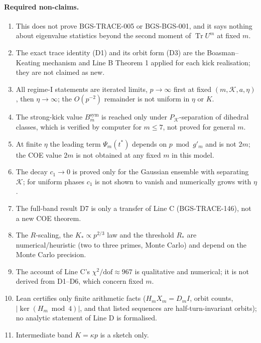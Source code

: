 \paragraph{Required non-claims.}
\begin{enumerate}[label=(\arabic*)]
\item This does not prove BGS-TRACE-005 or BGS-BGS-001, and it says nothing about eigenvalue statistics beyond the second moment of \(\operatorname{Tr}U^m\) at fixed \(m\).
\item The exact trace identity (D1) and its orbit form (D3) are the Boasman--Keating mechanism and Line B Theorem 1 applied for each kick realisation; they are not claimed as new.
\item All regime-I statements are iterated limits, \(p\to\infty\) first at fixed \((m,\mathcal K,a,\eta)\), then \(\eta\to\infty\); the \(O(p^{-2})\) remainder is not uniform in \(\eta\) or \(K\).
\item The strong-kick value \(B_m^{\mathrm{sym}}\) is reached only under \(P_{\mathcal K}\)-separation of dihedral classes, which is verified by computer for \(m\le 7\), not proved for general \(m\).
\item At finite \(\eta\) the leading term \(\Psi_m(t^*)\) depends on \(p \bmod g'_m\) and is not \(2m\); the COE value \(2m\) is not obtained at any fixed \(m\) in this model.
\item The decay \(c_1\to0\) is proved only for the Gaussian ensemble with separating \(\mathcal K\); for uniform phases \(c_1\) is not shown to vanish and numerically grows with \(\eta\).
\item The full-band result D7 is only a transfer of Line C (BGS-TRACE-146), not a new COE theorem.
\item The \(R\)-scaling, the \(K_*\propto p^{2/3}\) law and the threshold \(R_*\) are numerical/heuristic (two to three primes, Monte Carlo) and depend on the Monte Carlo precision.
\item The account of Line C's \(\chi^2/\mathrm{dof}\approx 967\) is qualitative and numerical; it is not derived from D1--D6, which concern fixed \(m\).
\item Lean certifies only finite arithmetic facts (\(H_mX_m=D_mI\), orbit counts, \(|\ker(H_m \bmod 4)|\), and that listed sequences are half-turn-invariant orbits); no analytic statement of Line D is formalised.
\item Intermediate band \(K=\kappa p\) is a sketch only.
\end{enumerate}

